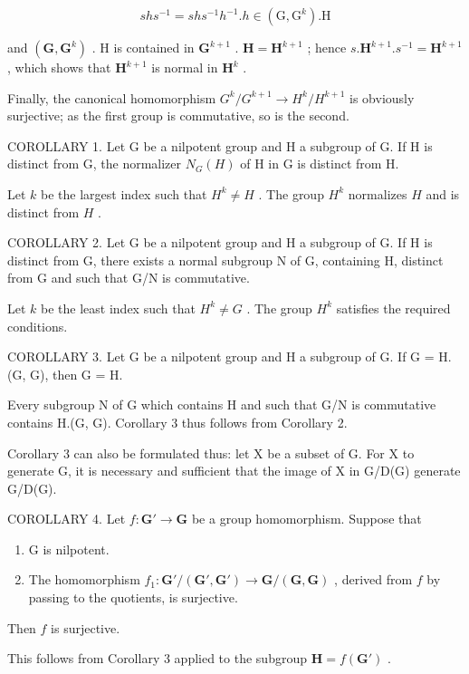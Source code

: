 \[
s h s ^ {- 1} = s h s ^ {- 1} h ^ {- 1}. h \in (\mathrm{G}, \mathrm{G} ^ {k}). \mathrm{H}
\]

and \((\mathbf{G},\mathbf{G}^k)\) . H is contained in \(\mathbf{G}^{k + 1}\) . \(\mathbf{H} = \mathbf{H}^{k + 1}\) ; hence \(s.\mathbf{H}^{k + 1}.s^{-1} = \mathbf{H}^{k + 1}\) , which shows that \(\mathbf{H}^{k + 1}\) is normal in \(\mathbf{H}^k\) .

Finally, the canonical homomorphism \(G^{k}/G^{k+1} \to H^{k}/H^{k+1}\) is obviously surjective; as the first group is commutative, so is the second.

COROLLARY 1. Let G be a nilpotent group and H a subgroup of G. If H is distinct from G, the normalizer \(N_{G}(H)\) of H in G is distinct from H.

Let \(k\) be the largest index such that \(H^{k} \neq H\) . The group \(H^{k}\) normalizes \(H\) and is distinct from \(H\) .

COROLLARY 2. Let G be a nilpotent group and H a subgroup of G. If H is distinct from G, there exists a normal subgroup N of G, containing H, distinct from G and such that G/N is commutative.

Let \(k\) be the least index such that \(H^k \neq G\) . The group \(H^k\) satisfies the required conditions.

COROLLARY 3. Let G be a nilpotent group and H a subgroup of G. If G = H.(G, G), then G = H.

Every subgroup N of G which contains H and such that G/N is commutative contains H.(G, G). Corollary 3 thus follows from Corollary 2.

Corollary 3 can also be formulated thus: let X be a subset of G. For X to generate G, it is necessary and sufficient that the image of X in G/D(G) generate G/D(G).

COROLLARY 4. Let \(f: \mathbf{G}' \to \mathbf{G}\) be a group homomorphism. Suppose that

\begin{enumerate}
\def\labelenumi{(\alph{enumi})}
\item
  G is nilpotent.
\item
  The homomorphism \(f_1 \colon \mathbf{G}' / (\mathbf{G}', \mathbf{G}') \to \mathbf{G} / (\mathbf{G}, \mathbf{G})\) , derived from \(f\) by passing to the quotients, is surjective.
\end{enumerate}

Then \(f\) is surjective.

This follows from Corollary 3 applied to the subgroup \(\mathbf{H} = f(\mathbf{G}')\) .

